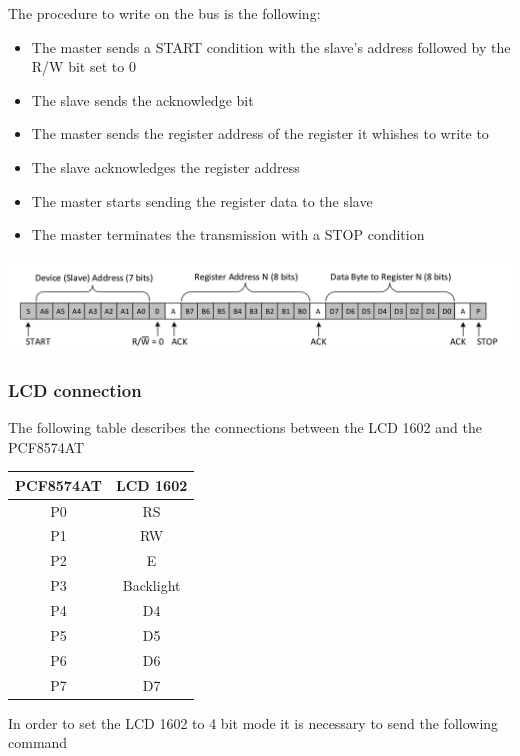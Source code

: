 \documentclass[]{article}
\begin{document}
The procedure to write on the bus is the following:
\begin{itemize}
    \item The master sends a START condition with the slave's address followed by the R/W bit set to 0
    \item The slave sends the acknowledge bit 
    \item The master sends the register address of the register it whishes to write to 
    \item The slave acknowledges the register address
    \item The master starts sending the register data to the slave 
    \item The master terminates the transmission with a STOP condition
\end{itemize}

\begin{center}
    \includegraphics[scale=0.4]{write_procedure}
\end{center}

\subsubsection{LCD connection}
The following table describes the connections between the LCD 1602 and the PCF8574AT 

\begin{center}
    \begin{tabular}{|c|c|} 
        \hline
        PCF8574AT & LCD 1602 \\
        \hline
        P0 & RS \\
        P1 & RW \\
        P2 & E \\
        P3 & Backlight \\
        P4 & D4 \\
        P5 & D5 \\
        P6 & D6 \\
        P7 & D7 \\
        \hline
    \end{tabular}
\end{center}

In order to set the LCD 1602 to 4 bit mode it is necessary to send the following command 
\end{document}
